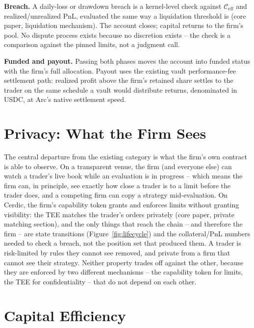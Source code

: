\documentclass[11pt,a4paper]{article}
\begin{document}
\textbf{Breach.} A daily-loss or drawdown breach is a kernel-level check against
$\mathcal{C}_{\text{eff}}$ and realized/unrealized PnL, evaluated the same way a liquidation
threshold is (core paper, liquidation mechanism). The account closes; capital returns to the
firm's pool. No dispute process exists because no discretion exists -- the check is a
comparison against the pinned limits, not a judgment call.

\textbf{Funded and payout.} Passing both phases moves the account into funded status with
the firm's full allocation. Payout uses the existing vault performance-fee settlement path:
realized profit above the firm's retained share settles to the trader on the same schedule
a vault would distribute returns, denominated in USDC, at Arc's native settlement speed.

\section{Privacy: What the Firm Sees}
\label{sec:privacy}

The central departure from the existing category is what the firm's own contract is able to
observe. On a transparent venue, the firm (and everyone else) can watch a trader's live
book while an evaluation is in progress -- which means the firm can, in principle, see
exactly how close a trader is to a limit before the trader does, and a competing firm can
copy a strategy mid-evaluation. On Cerdic, the firm's capability token grants and enforces
limits without granting visibility: the TEE matches the trader's orders privately (core
paper, private matching section), and the only things that reach the chain -- and therefore
the firm -- are state transitions (Figure~\ref{fig:lifecycle}) and the collateral/PnL
numbers needed to check a breach, not the position set that produced them. A trader is
risk-limited by rules they cannot see removed, and private from a firm that cannot see their
strategy. Neither property trades off against the other, because they are enforced by two
different mechanisms -- the capability token for limits, the TEE for confidentiality -- that
do not depend on each other.

\section{Capital Efficiency}
\label{sec:efficiency}
\end{document}
